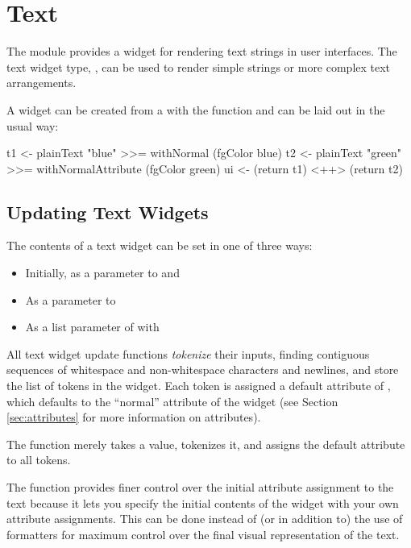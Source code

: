\section{Text}
\label{sec:text}

The  module provides a widget for rendering text strings in
user interfaces.  The text widget type, , can
be used to render simple strings or more complex text arrangements.

A  widget can be created from a  with the
 function and can be laid out in the usual way:

\begin{haskellcode}
 t1 <- plainText "blue" >>= withNormal (fgColor blue)
 t2 <- plainText "green" >>= withNormalAttribute (fgColor green)
 ui <- (return t1) <++> (return t2)
\end{haskellcode}

\subsection{Updating Text Widgets}
\label{sec:updatingText}

The contents of a text widget can be set in one of three ways:
\begin{itemize}
\item Initially, as a parameter to  and 
\item As a  parameter to 
\item As a list parameter of  with
\end{itemize}

All text widget update functions \textit{tokenize} their inputs,
finding contiguous sequences of whitespace and non-whitespace
characters and newlines, and store the list of tokens in the widget.
Each token is assigned a default attribute of , which
defaults to the ``normal'' attribute of the widget (see Section
\ref{sec:attributes} for more information on attributes).

The  function merely takes a  value, tokenizes
it, and assigns the default attribute to all tokens.

The  function provides finer control over the
initial attribute assignment to the text because it lets you specify
the initial contents of the widget with your own attribute
assignments.  This can be done instead of (or in addition to) the use
of formatters for maximum control over the final visual representation
of the text.

